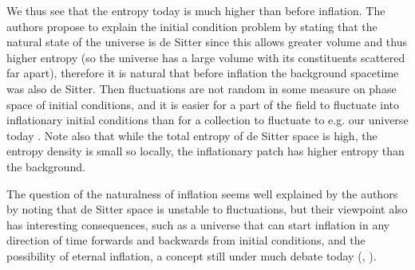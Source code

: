 \documentclass[12pt]{article}
\begin{document}
We thus see that the entropy today is much higher than before inflation. The authors propose to explain the initial condition problem by stating that the natural state of the universe is de Sitter since this allows greater volume and thus higher entropy (so the universe has a large volume with its constituents scattered far apart), therefore it is natural that before inflation the background spacetime was also de Sitter. Then fluctuations are not random in some measure on phase space of initial conditions, and it is easier for a part of the field to fluctuate into inflationary initial conditions than for a collection to fluctuate to e.g. our universe today \cite{Carroll2004a}. Note also that while the total entropy of de Sitter space is high, the entropy density is small so locally, the inflationary patch has higher entropy than the background.\par 

The question of the naturalness of inflation seems well explained by the authors by noting that de Sitter space is unstable to fluctuations, but their viewpoint also has interesting consequences, such as a universe that can start inflation in any direction of time forwards and backwards from initial conditions, and the possibility of eternal inflation, a concept still under much debate today (\cite{Carroll2004}, \cite{Carroll2004a}).



\end{document}
